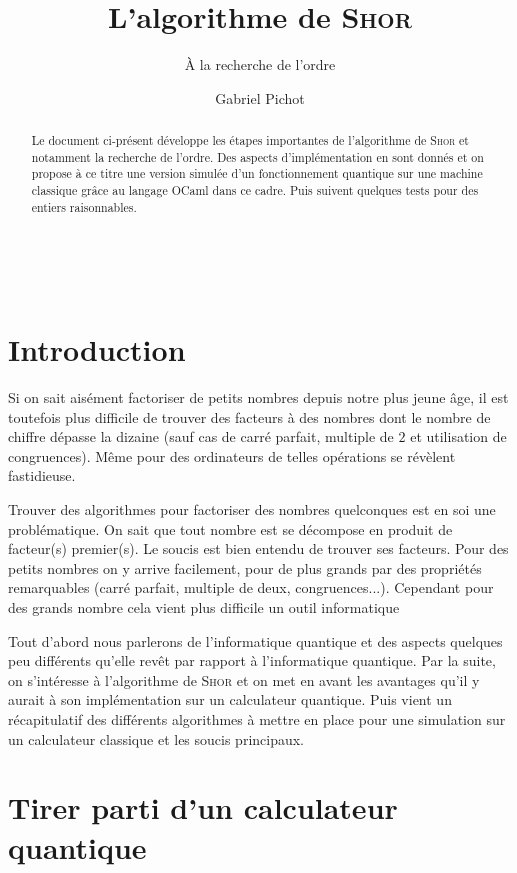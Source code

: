 \documentclass[a4paper,11pt]{tipe}
\title{L'algorithme de \textsc{Shor}}
\subtitle{À la recherche de l'ordre}
\author{Gabriel Pichot}
\begin{document}
\maketitle


\begin{abstract}
Le document ci-présent développe les étapes importantes de l'algorithme de
\textsc{Shor} et notamment la recherche de l'ordre. Des aspects
d'implémentation en sont donnés et on propose à ce titre une version simulée
d'un fonctionnement quantique sur une machine classique grâce au langage
OCaml dans ce cadre. Puis suivent quelques tests pour des entiers raisonnables.
\end{abstract}

~\thispagestyle{empty}
\newpage


\tableofcontents

\chapter*{Introduction}
Si on sait aisément factoriser de petits nombres depuis notre plus jeune
âge, il est toutefois plus difficile de trouver des facteurs à des
nombres dont le nombre de chiffre dépasse la dizaine (sauf cas de carré
parfait, multiple de $2$ et utilisation de congruences). Même pour des
ordinateurs de telles opérations se révèlent fastidieuse.

Trouver des algorithmes
pour factoriser des nombres quelconques est en soi une
problématique. On sait que tout nombre est se décompose en produit de facteur(s)
premier(s). Le soucis est bien entendu de trouver ses facteurs. Pour des petits
nombres on y arrive facilement, pour de plus grands par des propriétés
remarquables (carré parfait, multiple de deux, congruences...). Cependant pour
des grands nombre cela vient plus difficile un outil informatique

Tout d'abord nous parlerons de l'informatique quantique et des aspects quelques
peu différents qu'elle revêt par rapport à l'informatique quantique. Par la
suite, on s'intéresse à l'algorithme de \textsc{Shor} et on met en avant les
avantages qu'il y aurait à son implémentation sur un calculateur quantique.
Puis vient un récapitulatif des différents algorithmes à mettre en place pour
une simulation sur un calculateur classique et les soucis principaux.

\chapter{Tirer parti d'un calculateur quantique}
\end{document}
